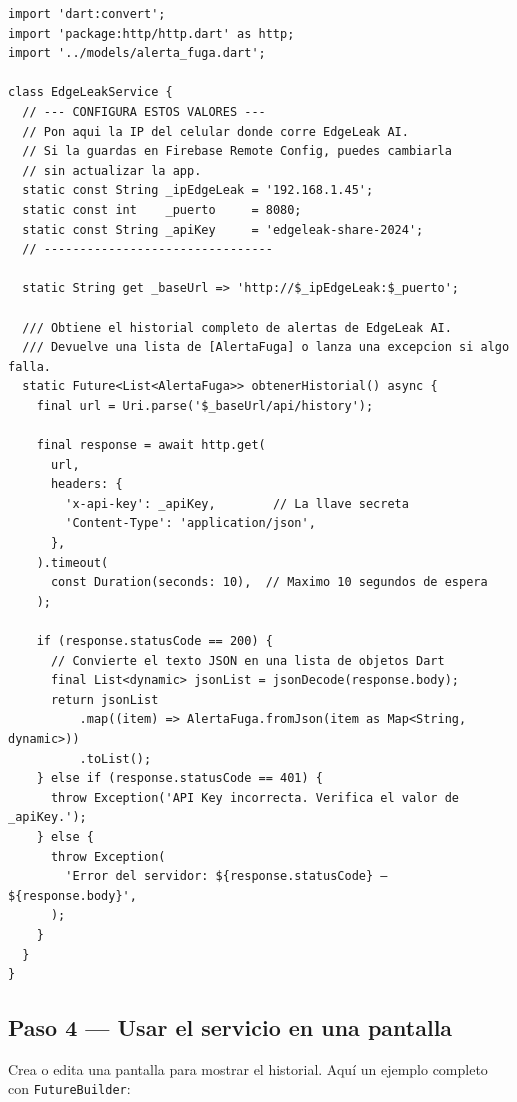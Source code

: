 \documentclass[12pt, a4paper]{article}
\begin{document}
\begin{lstlisting}[style=dartStyle, caption={lib/services/edgeleak\_service.dart}]
import 'dart:convert';
import 'package:http/http.dart' as http;
import '../models/alerta_fuga.dart';

class EdgeLeakService {
  // --- CONFIGURA ESTOS VALORES ---
  // Pon aqui la IP del celular donde corre EdgeLeak AI.
  // Si la guardas en Firebase Remote Config, puedes cambiarla
  // sin actualizar la app.
  static const String _ipEdgeLeak = '192.168.1.45';
  static const int    _puerto     = 8080;
  static const String _apiKey     = 'edgeleak-share-2024';
  // --------------------------------

  static String get _baseUrl => 'http://$_ipEdgeLeak:$_puerto';

  /// Obtiene el historial completo de alertas de EdgeLeak AI.
  /// Devuelve una lista de [AlertaFuga] o lanza una excepcion si algo falla.
  static Future<List<AlertaFuga>> obtenerHistorial() async {
    final url = Uri.parse('$_baseUrl/api/history');

    final response = await http.get(
      url,
      headers: {
        'x-api-key': _apiKey,        // La llave secreta
        'Content-Type': 'application/json',
      },
    ).timeout(
      const Duration(seconds: 10),  // Maximo 10 segundos de espera
    );

    if (response.statusCode == 200) {
      // Convierte el texto JSON en una lista de objetos Dart
      final List<dynamic> jsonList = jsonDecode(response.body);
      return jsonList
          .map((item) => AlertaFuga.fromJson(item as Map<String, dynamic>))
          .toList();
    } else if (response.statusCode == 401) {
      throw Exception('API Key incorrecta. Verifica el valor de _apiKey.');
    } else {
      throw Exception(
        'Error del servidor: ${response.statusCode} — ${response.body}',
      );
    }
  }
}
\end{lstlisting}

\subsection{Paso 4 — Usar el servicio en una pantalla}

Crea o edita una pantalla para mostrar el historial. Aquí un ejemplo
completo con \texttt{FutureBuilder}:
\end{document}
